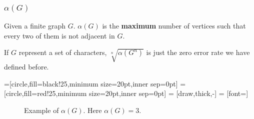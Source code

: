 \begin{frame}
      \frametitle{$\alpha(G)$}
      \begin{definition}[$\alpha(G)$]\label{def:alpha}
            Given a finite graph $G$. $\alpha(G)$ is the \textbf{maximum} number of vertices such that every two of them is not adjacent in $G$.

            If $G$ represent a set of characters, $\sqrt[n]{\alpha(G^{n})}$ is just the zero error rate we have defined before.

            \pause

            =[circle,fill=black!25,minimum size=20pt,inner sep=0pt]
            =[circle,fill=red!25,minimum size=20pt,inner sep=0pt]
             = [draw,thick,-]
             = [font=\small]
            \begin{figure}[h!]
                  \label{fig:alphaGExample}
                  \caption{Example of $ \alpha(G) $. Here $ \alpha(G) = 3 $.}
            \end{figure}
      \end{definition}
\end{frame}
